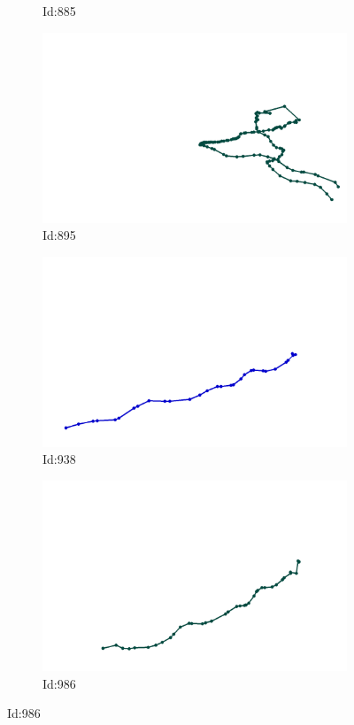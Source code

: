 \documentclass[12pt,twoside]{report}
\begin{document}
\begin{figure}
\begin{subfigure}[b]{0.20\textwidth}
\caption{Id:885}
\end{subfigure}
\begin{subfigure}[b]{0.20\textwidth}
\centering
\includegraphics[width=\textwidth]{../trajectories/895.png}
\caption{Id:895}
\end{subfigure}
\begin{subfigure}[b]{0.20\textwidth}
\centering
\includegraphics[width=\textwidth]{../trajectories/938.png}
\caption{Id:938}
\end{subfigure}
\begin{subfigure}[b]{0.20\textwidth}
\centering
\includegraphics[width=\textwidth]{../trajectories/986.png}
\caption{Id:986}
\end{subfigure}
\end{figure}
\end{document}
